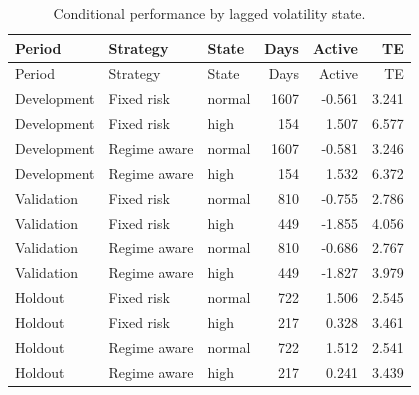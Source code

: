 \documentclass[11pt,a4paper]{article}
\begin{document}
\begin{center}\small\begin{longtable}{@{}lllrrr@{}}\caption{Conditional performance by lagged volatility state.}\label{tab-regimes}\\\toprule Period & Strategy & State & Days & Active & TE\\\midrule\endfirsthead\toprule Period & Strategy & State & Days & Active & TE\\\midrule\endhead

Development & Fixed risk & normal & 1607 & -0.561 & 3.241\\

Development & Fixed risk & high & 154 & 1.507 & 6.577\\

Development & Regime aware & normal & 1607 & -0.581 & 3.246\\

Development & Regime aware & high & 154 & 1.532 & 6.372\\

Validation & Fixed risk & normal & 810 & -0.755 & 2.786\\

Validation & Fixed risk & high & 449 & -1.855 & 4.056\\

Validation & Regime aware & normal & 810 & -0.686 & 2.767\\

Validation & Regime aware & high & 449 & -1.827 & 3.979\\

Holdout & Fixed risk & normal & 722 & 1.506 & 2.545\\

Holdout & Fixed risk & high & 217 & 0.328 & 3.461\\

Holdout & Regime aware & normal & 722 & 1.512 & 2.541\\

Holdout & Regime aware & high & 217 & 0.241 & 3.439\\

\bottomrule\end{longtable}\end{center}
\end{document}
